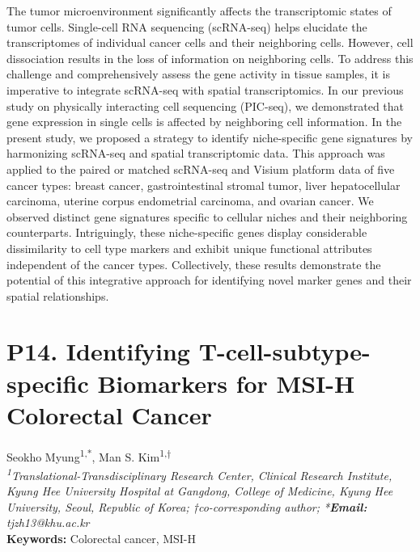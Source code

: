 \noindent
The tumor microenvironment significantly affects the transcriptomic states of tumor cells. Single-cell RNA sequencing (scRNA-seq) helps elucidate the transcriptomes of individual cancer cells and their neighboring cells. However, cell dissociation results in the loss of information on neighboring cells. To address this challenge and comprehensively assess the gene activity in tissue samples, it is imperative to integrate scRNA-seq with spatial transcriptomics. In our previous study on physically interacting cell sequencing (PIC-seq), we demonstrated that gene expression in single cells is affected by neighboring cell information. In the present study, we proposed a strategy to identify niche-specific gene signatures by harmonizing scRNA-seq and spatial transcriptomic data. This approach was applied to the paired or matched scRNA-seq and Visium platform data of five cancer types: breast cancer, gastrointestinal stromal tumor, liver hepatocellular carcinoma, uterine corpus endometrial carcinoma, and ovarian cancer. We observed distinct gene signatures specific to cellular niches and their neighboring counterparts. Intriguingly, these niche-specific genes display considerable dissimilarity to cell type markers and exhibit unique functional attributes independent of the cancer types. Collectively, these results demonstrate the potential of this integrative approach for identifying novel marker genes and their spatial relationships.
\newpage

\section*{P14. Identifying T-cell-subtype-specific Biomarkers for MSI-H Colorectal Cancer}

\begin{center}
Seokho Myung\textsuperscript{1,*}, Man S. Kim\textsuperscript{1,†} \\
\vspace{0.3cm}
\textit{\textsuperscript{1}Translational-Transdisciplinary Research Center, Clinical Research Institute, Kyung Hee University Hospital at Gangdong, College of Medicine, Kyung Hee University, Seoul, Republic of Korea; †co-corresponding author; *\textbf{Email:} tjzh13@khu.ac.kr} \\
\vspace{0.3cm}
\textbf{Keywords:} Colorectal cancer, MSI-H
\end{center}

